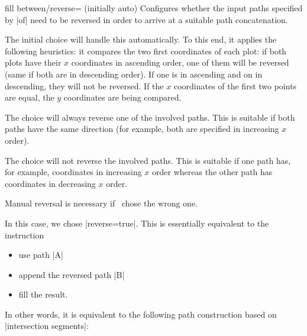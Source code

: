 \begin{tikzkey}{fill between/reverse= (initially auto)}
	Configures whether the input paths specified by |of| need to be reversed in order to arrive at a suitable path concatenation.

	The initial choice  will handle this automatically. To this end, it applies the following heuristics: it compares the two first coordinates of each plot: if both plots have their $x$ coordinates in ascending order, one of them will be reversed (same if both are in descending order). If one is in ascending and on in descending, they will not be reversed. If the $x$ coordinates of the first two points are equal, the $y$ coordinates are being compared.

	The choice  will always reverse one of the involved paths. This is suitable if both paths have the same direction (for example, both are specified in increasing $x$ order).

	The choice  will not reverse the involved paths. This is suitable if one path has, for example, coordinates in increasing $x$ order whereas the other path has coordinates in decreasing $x$ order.

	Manual reversal is necessary if \PGFPlots\ chose the wrong one.
\begin{codeexample}[]
\end{codeexample}
	In this case, we chose |reverse=true|. This is essentially equivalent to the instruction
	\begin{itemize}
		\item use path |A|
		\item append the reversed path |B|
		\item fill the result.
	\end{itemize}
	In other words, it is equivalent to the following path construction based on |intersection segments|:
\begin{codeexample}[]
\end{codeexample}
\end{tikzkey}
